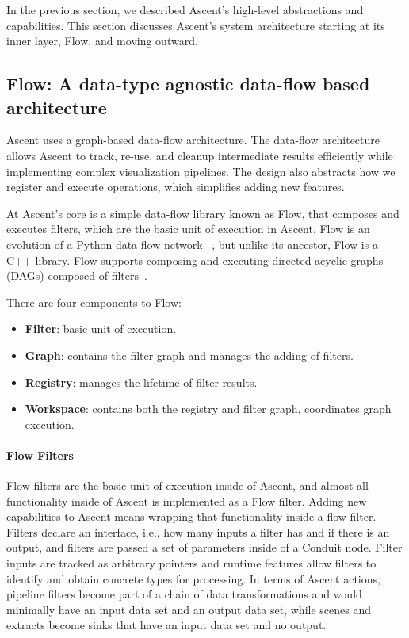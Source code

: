 In the previous section, we described Ascent's high-level abstractions and
capabilities.
%
This section discusses Ascent's system architecture starting at its inner layer, Flow,
and moving outward.

\subsection{Flow: A data-type agnostic data-flow based architecture}
Ascent uses a graph-based data-flow architecture.
The data-flow architecture allows Ascent to track, re-use, and cleanup intermediate
results efficiently while implementing complex visualization pipelines.
The design also abstracts how we register and execute operations,
which simplifies adding new features.

At Ascent's core is a simple data-flow library known as Flow, that
composes and executes filters, which are the basic unit of execution in Ascent.
%
Flow is an evolution of a Python data-flow network
~\cite{flow_reference}, but unlike its ancestor, Flow is a C++
library.
%
Flow supports composing and executing directed acyclic graphs
(DAGs) composed of filters~\cite{LarsenAscent}.

There are four components to Flow:
\begin{itemize}
  \item \textbf{Filter}: basic unit of execution.
  \item \textbf{Graph}: contains the filter graph and manages the adding of
filters.
  \item \textbf{Registry}: manages the lifetime of filter results.
  \item \textbf{Workspace}: contains both the registry and filter graph,
coordinates graph execution.
\end{itemize}

\paragraph{Flow Filters}
Flow filters are the basic unit of execution inside of Ascent, and
almost all functionality inside of Ascent is implemented as a Flow filter.
%
Adding new capabilities to Ascent means wrapping that functionality inside
a flow filter.
%
Filters declare an interface, i.e., how many inputs a filter has and
if there is an output, and filters are passed a set of parameters inside
of a Conduit
node.
%
Filter inputs are tracked as arbitrary pointers and runtime features allow
filters to identify and obtain concrete types for processing.
%
In terms of Ascent actions, pipeline filters become part of a chain of
data transformations and would minimally have an input
data set and an output data set, while scenes and extracts
become sinks that have an input data set and no output.
%

